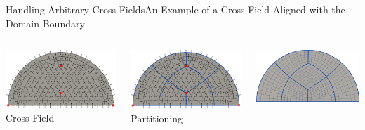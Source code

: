 \documentclass[compress,10pt,aspectratio=169]{beamer}
\begin{document}
\begin{frame}{Handling Arbitrary Cross-Fields}{An Example of a Cross-Field Aligned with the Domain Boundary}

    \begin{columns}
        \begin{column}{0.33\textwidth}
        \centering
        \includegraphics[scale=0.087]{images/demi_disc_align_first.pdf} \hspace{0.2cm}
        \footnotesize Cross-Field
        \end{column}
        \begin{column}{0.33\textwidth}
        \centering
        \includegraphics[scale=0.087]{images/demi_disc_align_second.pdf} \hspace{0.2cm}
        \footnotesize Partitioning
        \end{column}
        \begin{column}{0.33\textwidth}
        \centering
        \includegraphics[scale=0.087]{images/demi_disc_align_third.pdf} \hspace{0.2cm}

\end{column}
\end{columns}
\end{frame}
\end{document}
